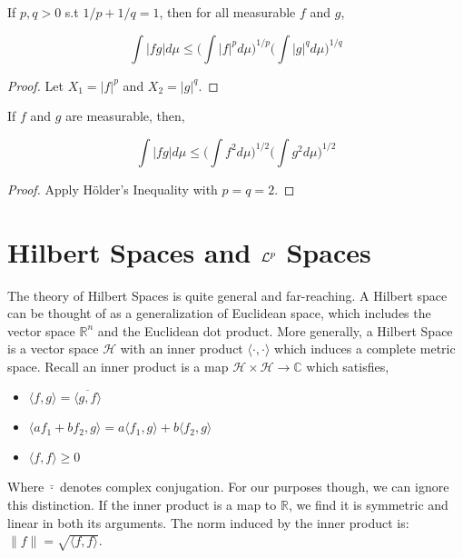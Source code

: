     \begin{corollary}
        If $p,q > 0$ s.t $1/p + 1/q = 1$, then for all measurable 
        $f$ and $g$, 

        \[ \int |fg|d\mu \leq \bigg( \int |f|^p  d\mu  \bigg)^{1/p}\bigg( \int |g|^q d\mu  \bigg)^{1/q} \]
    \end{corollary}

    \begin{proof}
        Let $X_1 = |f|^{p}$ and $X_2 = |g|^{q}$.
    \end{proof}

    \begin{corollary}
        If $f$ and $g$ are measurable, then, 

        \[ \int |fg|d\mu \leq \bigg( \int f^2  d\mu  \bigg)^{1/2}\bigg( \int g^2 d\mu  \bigg)^{1/2} \]

    \end{corollary}

    \begin{proof}
        Apply Hölder's Inequality with $p = q = 2$.
    \end{proof}

    \section{Hilbert Spaces and $\mathcal L^p$ Spaces}

    The theory of Hilbert Spaces is quite general and far-reaching. A Hilbert space can 
    be thought of as a generalization of Euclidean space, which includes the vector space 
    $\mathbb R^n$ and the Euclidean dot product. More generally, a Hilbert Space is a vector 
    space $\mathcal H$ with an inner product $\langle \cdot , \cdot \rangle$ which induces a 
    complete metric space. Recall an inner product is a map $\mathcal H \times \mathcal H \to \mathbb C$ which 
    satisfies, 

    \begin{itemize}
        \item $\langle f, g \rangle = \overline{\langle g,f \rangle}$
        \item $\langle af_1 + bf_2, g \rangle = a \langle f_1, g \rangle + b \langle f_2, g \rangle$
        \item $\langle f, f \rangle \geq 0$
    \end{itemize}

    Where $\bar{\cdot}$ denotes complex conjugation. For our purposes though, we can ignore 
    this distinction. If the inner product is a map to $\mathbb R$, we find it is symmetric and linear 
    in both its arguments. The norm induced by the inner product is: $\|f\| = \sqrt{\langle f,f \rangle}$. 

